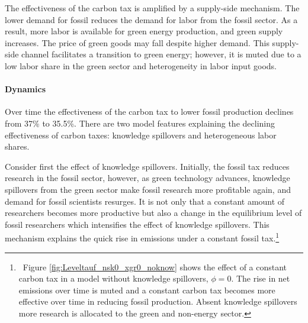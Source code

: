  The effectiveness of the carbon tax is amplified by a supply-side mechanism. 
 The lower demand for fossil reduces the demand for labor from the fossil sector. As a result, more labor is available for green energy production, and green supply increases. The price of green goods may fall despite higher demand. This supply-side channel facilitates a transition to green energy; however, it is muted due to a low labor share in the green sector and heterogeneity in labor input goods.


\paragraph{Dynamics}

Over time the effectiveness of the carbon tax to lower fossil production declines from 37\% to 35.5\%. There are two model features explaining the declining effectiveness of carbon taxes: knowledge spillovers and heterogeneous labor shares. 

Consider first the effect of knowledge spillovers.
Initially, the fossil tax reduces research in the fossil sector, however, as green technology advances, knowledge spillovers from the green sector make fossil research more profitable again, and demand for fossil scientists resurges.
It is not only that a constant amount of researchers becomes more productive but also a change in the equilibrium level of fossil researchers which intensifies the effect of knowledge spillovers. This mechanism explains the quick rise in emissions under a constant fossil tax.\footnote{\ Figure \ref{fig:Leveltauf_nsk0_xgr0_noknow} shows the effect of a constant carbon tax in a model without knowledge spillovers, $\phi=0$. The rise in net emissions over time is muted and a constant carbon tax becomes more effective over time in reducing fossil production.  Absent knowledge spillovers more research is allocated to the green and non-energy sector.} 

